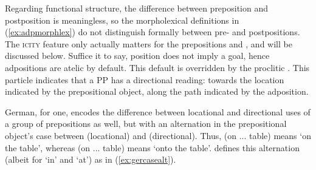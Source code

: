 Regarding functional structure, the difference between preposition and
postposition is meaningless, so the
morpholexical definitions in (\ref{ex:adpmorphlex}) do not distinguish formally
between pre- and postpositions. The
\Tel{}\textsc{icity} feature only actually matters for the
prepositions  and , and
will be discussed below. Suffice it to say, position does not imply a goal,
hence adpositions are atelic by default. This default is
overridden by the proclitic . This particle indicates that a PP
has a directional reading: towards the location indicated by the prepositional
object, along the path indicated by the adposition.

\begin{figure}
\begin{morphlex}
\pex\label{ex:adpmorphlex}%
\a\label{ex:adpmorphlex_1}

\a{}
\xe
\end{morphlex}
\end{figure}

German, for one, encodes the difference between locational and
directional uses of a group of prepositions as well, but with an alternation
in the prepositional object's case between \Dat{} (locational) and
\Acc{} (directional). Thus,  (on \Def{}.\Dat{}.\M{}.\Sg{}
table) means `on the table', whereas  (on
\Def{}.\Acc{}.\M{}.\Sg{} table) means `onto the table'. \citet{butt2005}
defines this alternation (albeit for  `in' and  `at') as in
(\ref{ex:gercasealt}).

